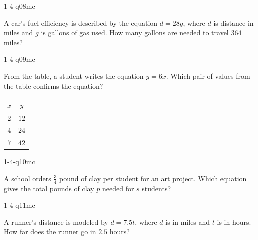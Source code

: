\begin{practiceQuestion}{1-4-q08}{mc}
\begin{questionText}
A car's fuel efficiency is described by the equation $d = 28g$, where $d$ is distance in miles and $g$ is gallons of gas used. How many gallons are needed to travel $364$ miles?
\end{questionText}
\end{practiceQuestion}

\begin{practiceQuestion}{1-4-q09}{mc}
\begin{questionText}
From the table, a student writes the equation $y = 6x$. Which pair of values from the table confirms the equation?

\begin{center}
\begin{tabular}{|c|c|}
\hline
$x$ & $y$ \\
\hline
$2$ & $12$ \\
$4$ & $24$ \\
$7$ & $42$ \\
\hline
\end{tabular}
\end{center}
\end{questionText}
\end{practiceQuestion}

\begin{practiceQuestion}{1-4-q10}{mc}
\begin{questionText}
A school orders $\frac{3}{4}$ pound of clay per student for an art project. Which equation gives the total pounds of clay $p$ needed for $s$ students?
\end{questionText}
\end{practiceQuestion}

\begin{practiceQuestion}{1-4-q11}{mc}
\begin{questionText}
A runner's distance is modeled by $d = 7.5t$, where $d$ is in miles and $t$ is in hours. How far does the runner go in $2.5$ hours?
\end{questionText}
\end{practiceQuestion}

